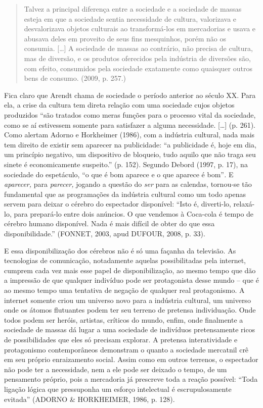 \begin{quote}
Talvez a principal diferença entre a sociedade e a sociedade de massas
esteja em que a sociedade sentia necessidade de cultura, valorizava e
desvalorizava objetos culturais ao transformá-los em mercadorias e usava
e abusava deles em proveito de seus fins mesquinhos, porém não os
consumia. {[}\ldots{}{]} A sociedade de massas ao contrário, não precisa
de cultura, mas de diversão, e os produtos oferecidos pela indústria de
diversões são, com efeito, consumidos pela sociedade exatamente como
quaisquer outros bens de consumo. (2009, p. 257.)
\end{quote}

Fica claro que Arendt chama de sociedade o período anterior ao século
XX. Para ela, a crise da cultura tem direta relação com uma sociedade
cujos objetos produzidos ``são tratados como meras funções para o
processo vital da sociedade, como se aí estivessem somente para
satisfazer a alguma necessidade. {[}\ldots{}{]} (p. 261). Como alertam
Adorno e Horkheimer (1986), com a indústria cultural, nada mais tem
direito de existir sem aparecer na publicidade: ``a publicidade é, hoje
em dia, um princípio negativo, um dispositivo de bloqueio, tudo aquilo
que não traga seu sinete é economicamente suspeito.'' (p. 152). Segundo
Debord (1997, p. 17), na sociedade do espetáculo, ``o que é bom aparece
e o que aparece é bom''\emph{.} E \emph{aparecer,} para \emph{parecer,}
jogando a questão do \emph{ser} para as calendas, tornou-se tão
fundamental que as programações da indústria cultural como um todo
apenas servem para deixar o cérebro do espectador disponível: ``Isto é,
diverti-lo, relaxá-lo, para prepará-lo entre dois anúncios. O que
vendemos à Coca-cola é tempo de cérebro humano disponível. Nada é mais
difícil de obter do que essa disponibilidade.'' (FONNET, 2003, apud
DUFOUR, 2008, p. 33).

E essa disponibilização dos cérebros não é só uma façanha da televisão.
As tecnologias de comunicação, notadamente aquelas possibilitadas pela
internet, cumprem cada vez mais esse papel de disponibilização, ao mesmo
tempo que dão a impressão de que qualquer indivíduo pode ser
protagonista desse mundo -- que é ao mesmo tempo uma tentativa de
negação de qualquer real protagonismo. A internet somente criou um
universo novo para a indústria cultural, um universo onde os átomos
flutuantes podem ter seu terreno de pretensa individuação. Onde todos
podem ser heróis, artistas, críticos do mundo, enfim, onde finalmente a
sociedade de massas dá lugar a uma sociedade de indivíduos pretensamente
ricos de possibilidades que eles só precisam explorar. A pretensa
interatividade e protagonismo contemporâneos demonstram o quanto a
sociedade mercatnil crê em seu próprio enraizamento social. Assim como
em outros terrenos, o espectador não pode ter a necessidade, nem a ele
pode ser deixado o tempo, de um pensamento próprio, pois a mercadoria já
prescreve toda a reação possível: ``Toda ligação lógica que pressuponha
um esforço intelectual é escrupulosamente evitada'' (ADORNO \&
HORKHEIMER, 1986, p. 128).

